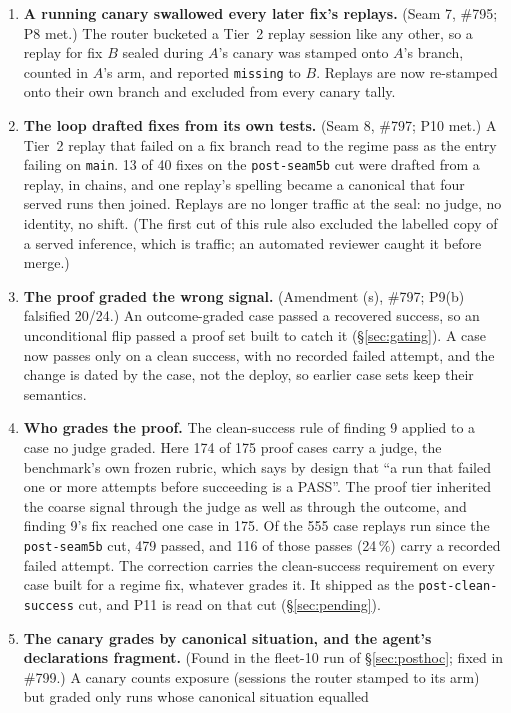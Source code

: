 \documentclass[11pt]{article}
\newcommand{\code}[1]{\texttt{#1}}
\begin{document}
\begin{enumerate}[leftmargin=1.6em, itemsep=0.35em]
{failure} at 0.79); it is left on by decision, with its cost stated.
\item \textbf{A running canary swallowed every later fix's replays.} (Seam 7, \#795; P8 met.)
The router bucketed a Tier~2 replay session like any other, so a replay for fix $B$ sealed during
$A$'s canary was stamped onto $A$'s branch, counted in $A$'s arm, and reported \code{missing} to
$B$. Replays are now re-stamped onto their own branch and excluded from every canary tally.
\item \textbf{The loop drafted fixes from its own tests.} (Seam 8, \#797; P10 met.) A Tier~2
replay that failed on a fix branch read to the regime pass as the entry failing on \code{main}.
13 of 40 fixes on the \code{post-seam5b} cut were drafted from a replay, in chains, and one
replay's spelling became a canonical that four served runs then joined. Replays are no longer
traffic at the seal: no judge, no identity, no shift. (The first cut of this rule also excluded
the labelled copy of a served inference, which is traffic; an automated reviewer caught it
before merge.)
\item \textbf{The proof graded the wrong signal.} (Amendment (s), \#797; P9(b) falsified
20/24.) An outcome-graded case passed a recovered success, so an unconditional flip passed a
proof set built to catch it (\S\ref{sec:gating}). A case now passes only on a clean success,
with no recorded failed attempt, and the change is dated by the case, not the deploy, so earlier
case sets keep their semantics.
\item \textbf{Who grades the proof.} The clean-success rule of finding 9 applied to a case no
judge graded. Here 174 of 175 proof cases carry a judge, the benchmark's own frozen rubric, which
says by design that ``a run that failed one or more attempts before succeeding is a PASS''. The
proof tier inherited the coarse signal through the judge as well as through the outcome, and
finding 9's fix reached one case in 175. Of the 555 case replays run since the
\code{post-seam5b} cut, 479 passed, and 116 of those passes (24\,\%) carry a recorded failed
attempt. The correction carries the clean-success requirement on every case built for a regime
fix, whatever grades it. It shipped as the \code{post-clean-success} cut, and P11 is read on
that cut (\S\ref{sec:pending}).
\item \textbf{The canary grades by canonical situation, and the agent's declarations fragment.}
(Found in the fleet-10 run of \S\ref{sec:posthoc}; fixed in \#799.) A canary counts exposure
(sessions the router stamped to its arm) but graded only runs whose canonical situation equalled

\end{enumerate}
\end{document}
